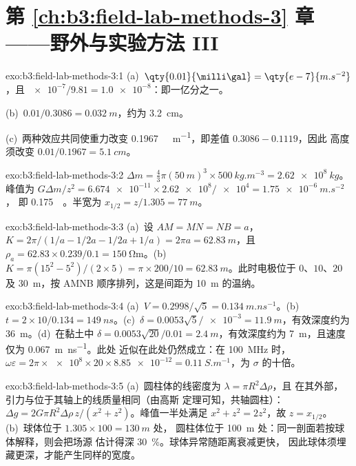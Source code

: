 \section*{第 \ref{ch:b3:field-lab-methods-3} 章——野外与实验方法 III}

\begin{solution}{exo:b3:field-lab-methods-3:1}
(a)~$\qty{0.01}{\milli\gal} = \qty{e-7}{m.s^{-2}}$，且
$\num{e-7}/\num{9.81} = \num{1.0e-8}$：即一亿分之一。

(b)~$0.01/0.3086 = \qty{0.032}{m}$，约为 \qty{3.2}{cm}。

(c)~两种效应共同使重力改变
\qty{0.1967}{\milli\gal.m^{-1}}，即差值 $0.3086 - 0.1119$，因此
高度须改变 $0.01/0.1967 = \qty{5.1}{cm}$。
\end{solution}

\begin{solution}{exo:b3:field-lab-methods-3:2}
$\Delta m = \tfrac43\pi(\qty{50}{m})^3\times\qty{500}{kg.m^{-3}} =
\qty{2.62e8}{kg}$。峰值为 $G\Delta m/z^2 =
\num{6.674e-11}\times\num{2.62e8}/\num{e4} = \qty{1.75e-6}{m.s^{-2}}$，
即 \qty{0.175}{\milli\gal}。半宽为 $x_{1/2} = z/1.305 =
\qty{77}{m}$。
\end{solution}

\begin{solution}{exo:b3:field-lab-methods-3:3}
(a)~设 $AM = MN = NB = a$，$K = 2\pi/(1/a - 1/2a - 1/2a + 1/a) =
2\pi a = \qty{62.83}{m}$，且 $\rho_a = 62.83\times0.239/0.1 =
\qty{150}{\ohm\metre}$。(b)~$K = \pi(15^2 - 5^2)/(2\times5) = \pi\times
200/10 = \qty{62.83}{m}$。此时电极位于 $0$、$10$、$20$
及 \qty{30}{m}，按 AMNB 顺序排列，这是间距为
\qty{10}{m} 的温纳。
\end{solution}

\begin{solution}{exo:b3:field-lab-methods-3:4}
(a)~$V = 0.2998/\sqrt5 = \qty{0.134}{m.ns^{-1}}$。(b)~$t =
2\times10/0.134 = \qty{149}{ns}$。(c)~$\delta = 0.0053\sqrt5/\num{e-3} =
\qty{11.9}{m}$，有效深度约为 \qty{36}{m}。(d)~在黏土中
$\delta = 0.0053\sqrt{20}/0.01 = \qty{2.4}{m}$，有效深度约为
\qty{7}{m}，且速度仅为 \qty{0.067}{m.ns^{-1}}。此处
近似在此处仍然成立：在 \qty{100}{MHz} 时，
$\omega\varepsilon = 2\pi\times\num{e8}\times20\times\num{8.85e-12} =
\qty{0.11}{S.m^{-1}}$，为 $\sigma$ 的十倍。
\end{solution}

\begin{solution}{exo:b3:field-lab-methods-3:5}
(a)~圆柱体的线密度为 $\lambda = \pi R^2\Delta\rho$，且
在其外部，引力与位于其轴上的线质量相同（由高斯
定理可知，共轴圆柱）：$\Delta g = 2G\pi R^2\Delta\rho\,z/(x^2
+ z^2)$。峰值一半处满足 $x^2 + z^2 = 2z^2$，故 $z =
x_{1/2}$。(b)~球体位于 $1.305\times100 = \qty{130}{m}$ 处，
圆柱体位于 \qty{100}{m} 处：同一剖面若按球体解释，则会把场源
估计得深 \qty{30}{\percent}。球体异常随距离衰减更快，
因此球体须埋藏更深，才能产生同样的宽度。
\end{solution}

